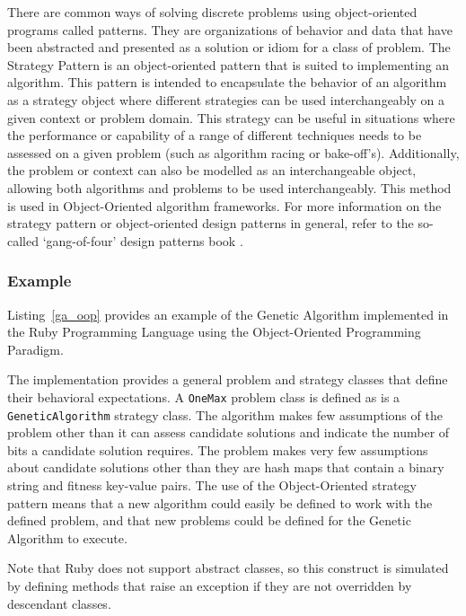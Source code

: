 There are common ways of solving discrete problems using object-oriented programs called patterns. They are organizations of behavior and data that have been abstracted and presented as a solution or idiom for a class of problem. The Strategy Pattern is an object-oriented pattern that is suited to implementing an algorithm. This pattern is intended to encapsulate the behavior of an algorithm as a strategy object where different strategies can be used interchangeably on a given context or problem domain. This strategy can be useful in situations where the performance or capability of a range of different techniques needs to be assessed on a given problem (such as algorithm racing or bake-off's). Additionally, the problem or context can also be modelled as an interchangeable object, allowing both algorithms and problems to be used interchangeably. This method is used in Object-Oriented algorithm frameworks.
For more information on the strategy pattern or object-oriented design patterns in general, refer to the so-called `gang-of-four' design patterns book \cite{Gamma1995}.

\subsubsection{Example}
Listing~\ref{ga_oop} provides an example of the Genetic Algorithm implemented in the Ruby Programming Language using the Object-Oriented Programming Paradigm. 

The implementation provides a general problem and strategy classes that define their behavioral expectations. A \texttt{OneMax} problem class is defined as is a \texttt{GeneticAlgorithm} strategy class. The algorithm makes few assumptions of the problem other than it can assess candidate solutions and indicate the number of bits a candidate solution requires. The problem makes very few assumptions about candidate solutions other than they are hash maps that contain a binary string and fitness key-value pairs. The use of the Object-Oriented strategy pattern means that a new algorithm could easily be defined to work with the defined problem, and that new problems could be defined for the Genetic Algorithm to execute.

Note that Ruby does not support abstract classes, so this construct is simulated by defining methods that raise an exception if they are not overridden by descendant classes.




